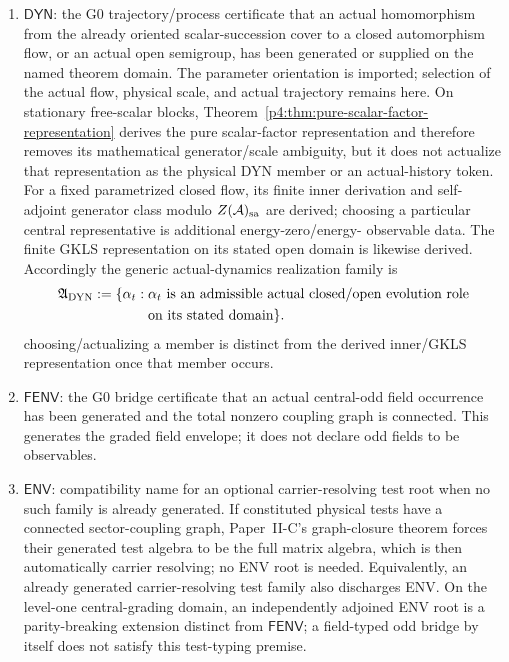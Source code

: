 \documentclass[12pt,a4paper]{article}
\begin{document}
\begin{enumerate}[label=(\roman*), leftmargin=2.3em]
      for a generated system--environment dilation.  The factor-local joint
      action is the type-correct map
      \(\operatorname{id}\otimes\Phi\); its positivity is therefore process
      well-typedness rather than an independent same-copy axiom.  Linearity,
      trace preservation, complete positivity, and Kraus form are derived.
\item \(\mathsf{DYN}\): the G0 trajectory/process certificate that an actual homomorphism from the already oriented
      scalar-succession cover to a closed automorphism flow, or an actual open
      semigroup, has been generated or supplied on the named theorem domain.
      The parameter orientation is imported; selection of the actual flow,
      physical scale, and actual trajectory remains here.  On stationary
      free-scalar blocks, Theorem~\ref{p4:thm:pure-scalar-factor-representation}
      derives the pure scalar-factor representation and therefore removes its
      mathematical generator/scale ambiguity, but it does not actualize that
      representation as the physical DYN member or an actual-history token.
      For a fixed parametrized closed flow, its finite inner derivation and self-adjoint
      generator class modulo \(Z(\mathcal A)_{\rm sa}\) are derived; choosing a
      particular central representative is additional energy-zero/energy-
      observable data.  The finite GKLS representation on its stated open
      domain is likewise derived.
      Accordingly the generic actual-dynamics realization family is
      \[
      \begin{aligned}
        \mathfrak A_{\rm DYN}:=\{\alpha_t:\;&\alpha_t\text{ is an admissible
        actual closed/open evolution role}\\
        &\text{on its stated domain}\}.
      \end{aligned}
      \]
      choosing/actualizing a member is distinct from the derived inner/GKLS
      representation once that member occurs.
\item \(\mathsf{FENV}\): the G0 bridge certificate that an actual central-odd field occurrence has been
      generated and the total nonzero coupling graph is connected.  This
      generates the graded field envelope; it does not declare odd fields to
      be observables.
\item \(\mathsf{ENV}\): compatibility name for an optional carrier-resolving
      test root when no such family is already generated.  If constituted
      physical tests have a connected sector-coupling graph, Paper~II-C's
      graph-closure theorem forces their generated test algebra to be the full
      matrix algebra, which is then automatically carrier resolving; no ENV
      root is needed.  Equivalently, an already generated carrier-resolving
      test family also discharges ENV.  On the level-one central-grading
      domain, an independently adjoined ENV root is a parity-breaking
      extension distinct from \(\mathsf{FENV}\); a field-typed odd bridge by
      itself does not satisfy this test-typing premise.
\end{enumerate}
\end{document}
